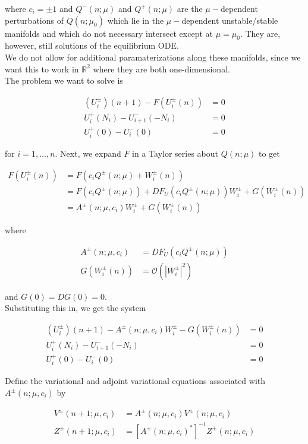 \documentclass[12pt]{article}
\def\R{{\mathbb R}}
\begin{document}
where $c_i = \pm 1$ and $Q^-(n; \mu)$ and $Q^+(n;\mu)$ are the $\mu-$dependent perturbations of $Q(n; \mu_0)$ which lie in the $\mu-$dependent unstable/stable manifolds and which do not necessary intersect except at $\mu = \mu_0$. They are, however, still solutions of the equilibrium ODE.\\

We do not allow for additional paramaterizations along these manifolds, since we want this to work in $\R^2$ where they are both one-dimensional. \\

The problem we want to solve is

\begin{align}
(U_i^\pm)(n+1) - F(U_i^\pm(n)) &= 0 \\
U_i^+(N_i) - U_{i+1}^-(-N_i) &= 0 \\
U_i^+(0) - U_i^-(0) &= 0
\end{align}

for $i = 1, \dots, n$. Next, we expand $F$ in a Taylor series about $Q(n; \mu)$ to get

\begin{align*}
F(U_i^\pm(n)) &= F(c_i Q^\pm(n; \mu) + W_i^\pm(n)) \\
&= F(c_i Q^\pm(n; \mu)) + DF_{U}(c_i Q^\pm(n; \mu)) W_i^\pm + G(W_i^\pm(n)) \\
&= A^\pm(n; \mu, c_i) W_i^\pm + G(W_i^\pm(n))
\end{align*}

where

\begin{align*}
A^\pm(n; \mu, c_i) &= DF_{U}(c_i Q^\pm(n; \mu))\\
G(W_i^\pm(n)) &= \mathcal{O}(|W_i^\pm|^2)
\end{align*}

and $G(0) = DG(0) = 0$.\\

Substituting this in, we get the system

\begin{align}
(U_i^\pm)(n+1) - A^\pm(n; \mu, c_i) W_i^\pm - G(W_i^\pm(n)) &= 0 \\
U_i^+(N_i) - U_{i+1}^-(-N_i) &= 0 \\
U_i^+(0) - U_i^-(0) &= 0
\end{align}

Define the variational and adjoint variational equations associated with $A^\pm(n; \mu, c_i)$ by

\begin{align}
V^\pm(n+1; \mu, c_i) &= A^\pm(n; \mu, c_i) V^\pm(n; \mu, c_i) \label{vareq} \\
Z^\pm(n+1; \mu, c_i) &= [A^\pm(n; \mu, c_i)^*]^{-1} Z^\pm(n; \mu, c_i) \label{adjvareq}
\end{align}
\end{document}

